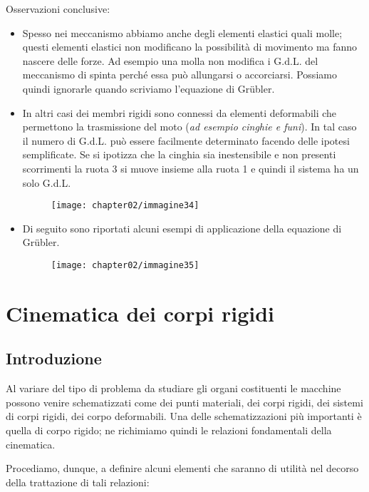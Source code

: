 	Osservazioni conclusive:
	\begin{itemize}
	\item Spesso nei meccanismo abbiamo anche degli elementi elastici quali molle; questi elementi elastici non modificano la possibilità di movimento ma fanno nascere delle forze.\newline
	Ad esempio una molla non modifica i G.d.L. del meccanismo di spinta perché essa può allungarsi o accorciarsi. Possiamo quindi ignorarle quando scriviamo l'equazione di Gr\"ubler.
	\item In altri casi dei membri rigidi sono connessi da elementi deformabili che permettono la trasmissione del moto (\emph{ad esempio cinghie e funi}). In tal caso il numero di G.d.L. può essere facilmente determinato facendo delle ipotesi semplificate.\newline
	Se si ipotizza che la cinghia sia inestensibile e non presenti scorrimenti la ruota 3 si muove insieme alla ruota 1 e quindi il sistema ha un solo G.d.L.
	\begin{figure}[h]
	\centering
	\texttt{[image: chapter02/immagine34]}
	\end{figure}
	\item Di seguito sono riportati alcuni esempi di applicazione della equazione di  Gr\"ubler.\newline
	\begin{figure}[h]
	\centering
	\texttt{[image: chapter02/immagine35]}
	\end{figure}
		\end{itemize}

	\section{Cinematica dei corpi rigidi}
		\subsection{Introduzione}
		
			Al variare del tipo di problema da studiare gli organi costituenti le macchine possono venire schematizzati come dei punti materiali, dei corpi rigidi, dei sistemi di corpi rigidi, dei corpo deformabili. Una delle schematizzazioni più importanti è quella di corpo rigido; ne richimiamo quindi le relazioni fondamentali della cinematica.
		
			Procediamo, dunque, a definire alcuni elementi che saranno di utilità nel decorso della trattazione di tali relazioni:
		
